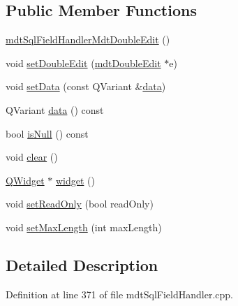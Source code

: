 \subsection*{Public Member Functions}
\begin{DoxyCompactItemize}
\item 
\hyperlink{classmdt_sql_field_handler_mdt_double_edit_a857887e480dfbcbd44368c67502c055d}{mdt\-Sql\-Field\-Handler\-Mdt\-Double\-Edit} ()
\item 
void \hyperlink{classmdt_sql_field_handler_mdt_double_edit_a51657f6dc0d6ad2754724888c77c5641}{set\-Double\-Edit} (\hyperlink{classmdt_double_edit}{mdt\-Double\-Edit} $\ast$e)
\item 
void \hyperlink{classmdt_sql_field_handler_mdt_double_edit_a4b9c206734fd669e81b71ae05bd5e090}{set\-Data} (const Q\-Variant \&\hyperlink{classmdt_sql_field_handler_mdt_double_edit_a2cd035dd532fed80822173e8b2e4cc99}{data})
\item 
Q\-Variant \hyperlink{classmdt_sql_field_handler_mdt_double_edit_a2cd035dd532fed80822173e8b2e4cc99}{data} () const 
\item 
bool \hyperlink{classmdt_sql_field_handler_mdt_double_edit_a17e263b0ba471553e79f0974dda5e296}{is\-Null} () const 
\item 
void \hyperlink{classmdt_sql_field_handler_mdt_double_edit_a42e5788c6807f673e4f0600a89499bc3}{clear} ()
\item 
\hyperlink{class_q_widget}{Q\-Widget} $\ast$ \hyperlink{classmdt_sql_field_handler_mdt_double_edit_a92b09a4317834218f60170317c08aa49}{widget} ()
\item 
void \hyperlink{classmdt_sql_field_handler_mdt_double_edit_ade3026eb59952fe664b86b703d1a606c}{set\-Read\-Only} (bool read\-Only)
\item 
void \hyperlink{classmdt_sql_field_handler_mdt_double_edit_ac621c585a7854de6c80c6eec3d97e6cd}{set\-Max\-Length} (int max\-Length)
\end{DoxyCompactItemize}


\subsection{Detailed Description}


Definition at line 371 of file mdt\-Sql\-Field\-Handler.\-cpp.



